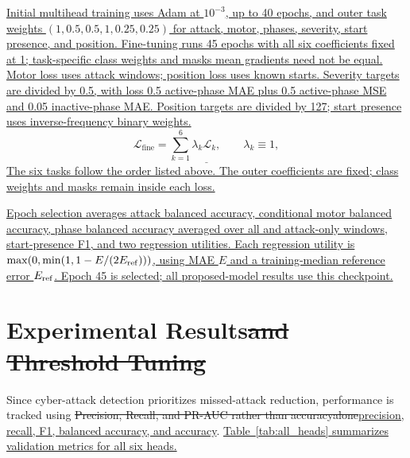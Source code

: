 \documentclass[conference,onecolumn,letterpaper]{IEEEtran} %
\providecommand{\DIFadd}[1]{{\protect\color{blue} \sf #1}} %
\providecommand{\DIFdel}[1]{{\protect\color{red} \scriptsize #1}} %
\providecommand{\DIFaddbegin}{} %
\providecommand{\DIFaddend}{} %
\providecommand{\DIFdelbegin}{} %
\providecommand{\DIFdelend}{} %
\renewcommand{\DIFadd}[1]{{\protect\color{blue}\protect\uline{#1}}}
\renewcommand{\DIFdel}[1]{{\protect\color{red}\protect\sout{#1}}}
\begin{document}
\DIFadd{Initial multihead training uses Adam at $10^{-3}$, up to 40 epochs, and outer task weights $(1,0.5,0.5,1,0.25,0.25)$ for attack, motor, phases, severity, start presence, and position. Fine-tuning runs 45 epochs with all six coefficients fixed at 1; task-specific class weights and masks mean gradients need not be equal. Motor loss uses attack windows; position loss uses known starts. Severity targets are divided by 0.5, with loss 0.5 active-phase MAE plus 0.5 active-phase MSE and 0.05 inactive-phase MAE. Position targets are divided by 127; start presence uses inverse-frequency binary weights.
}\DIFaddend
{\color{blue}\begin{equation}
\underline{\displaystyle \mathcal{L}_{\mathrm{fine}}=\sum_{k=1}^{6}\lambda_k\mathcal{L}_k,\qquad \lambda_k\equiv1,}
\label{eq:multitask_loss}
\end{equation}}
\DIFaddbegin \DIFadd{The six tasks follow the order listed above. The outer coefficients are fixed; class weights and masks remain inside each loss.}


\DIFadd{Epoch selection averages attack balanced accuracy, conditional motor balanced accuracy, phase balanced accuracy averaged over all and attack-only windows, start-presence F1, and two regression utilities. Each regression utility is $\max(0,\min(1,1-E/(2E_{\rm ref})))$, using MAE $E$ and a training-median reference error $E_{\rm ref}$. Epoch 45 is selected; all proposed-model results use this checkpoint.
}

\DIFaddend \section{Experimental Results\DIFdelbegin \DIFdel{and Threshold Tuning}\DIFdelend }

Since cyber-attack detection prioritizes missed-attack reduction, performance is tracked using \DIFdelbegin \DIFdel{Precision, Recall, and PR-AUC rather than accuracyalone}\DIFdelend \DIFaddbegin \DIFadd{precision, recall, F1, balanced accuracy, and accuracy}\DIFaddend . \DIFaddbegin \DIFadd{Table~\ref{tab:all_heads} summarizes validation metrics for all six heads.}\DIFaddend
\end{document}
